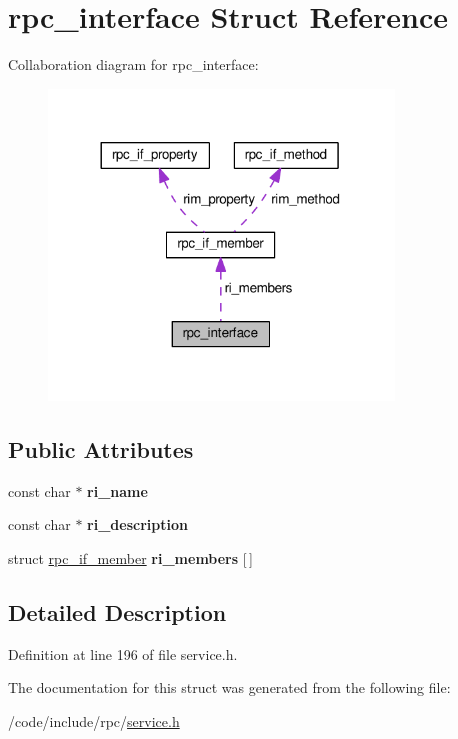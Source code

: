 \hypertarget{structrpc__interface}{}\section{rpc\+\_\+interface Struct Reference}
\label{structrpc__interface}


Collaboration diagram for rpc\+\_\+interface\+:
\nopagebreak
\begin{figure}[H]
\begin{center}
\leavevmode
\includegraphics[width=260pt]{structrpc__interface__coll__graph}
\end{center}
\end{figure}
\subsection*{Public Attributes}
\begin{DoxyCompactItemize}
\item 
const char $\ast$ {\bfseries ri\+\_\+name}\hypertarget{structrpc__interface_a7e1b33ccc8a32e6daaf69ec6daec7bc1}{}\label{structrpc__interface_a7e1b33ccc8a32e6daaf69ec6daec7bc1}

\item 
const char $\ast$ {\bfseries ri\+\_\+description}\hypertarget{structrpc__interface_a851f0bfb495af801a2958fef34596e6a}{}\label{structrpc__interface_a851f0bfb495af801a2958fef34596e6a}

\item 
struct \hyperlink{structrpc__if__member}{rpc\+\_\+if\+\_\+member} {\bfseries ri\+\_\+members} \mbox{[}$\,$\mbox{]}\hypertarget{structrpc__interface_af28bb2a8e330bb25c2c7e681cd2f7356}{}\label{structrpc__interface_af28bb2a8e330bb25c2c7e681cd2f7356}

\end{DoxyCompactItemize}


\subsection{Detailed Description}


Definition at line 196 of file service.\+h.



The documentation for this struct was generated from the following file\+:\begin{DoxyCompactItemize}
\item 
/code/include/rpc/\hyperlink{service_8h}{service.\+h}\end{DoxyCompactItemize}
